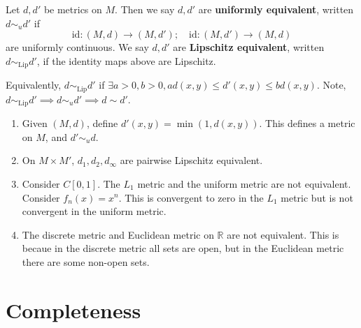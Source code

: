 \documentclass[a4paper,11pt]{article}
\begin{document}
\begin{definition}
	Let \( d, d' \) be metrics on \( M \).
	Then we say \( d, d' \) are \textbf{uniformly equivalent}, written \( d \sim_u d' \) if
	\[
		\mathrm{id} \colon (M, d) \to (M, d');\quad \mathrm{id} \colon (M, d') \to (M, d)
	\]
	are uniformly continuous.
	We say \( d, d' \) are \textbf{Lipschitz equivalent}, written \( d \sim_\mathrm{Lip} d' \), if the identity maps above are Lipschitz.
\end{definition}
Equivalently, \( d \sim_\mathrm{Lip} d' \) if \( \exists a > 0, b > 0, ad(x,y) \leq d'(x,y) \leq bd(x,y) \).
	Note, \( d \sim_\mathrm{Lip} d' \implies d \sim_u d' \implies d \sim d' \).
\begin{example}
	\begin{enumerate}
        \item Given \( (M,d) \), define \( d'(x,y) = \min(1,d(x,y)) \).
        This defines a metric on \( M \), and \( d' \sim_u d \).
    
        \item On \( M \times M' \), \( d_1, d_2, d_\infty \) are pairwise Lipschitz equivalent.
    
        \item Consider \( C[0,1] \).
        The \( L_1 \) metric and the uniform metric are not equivalent.
        Consider \( f_n(x) = x^n \).
        This is convergent to zero in the \( L_1 \) metric but is not convergent in the uniform metric.
    
        \item The discrete metric and Euclidean metric on \( \mathbb R \) are not equivalent.
        This is becaue in the discrete metric all sets are open, but in the Euclidean metric there are some non-open sets.
    \end{enumerate}
\end{example}

\section{Completeness}
\end{document}
